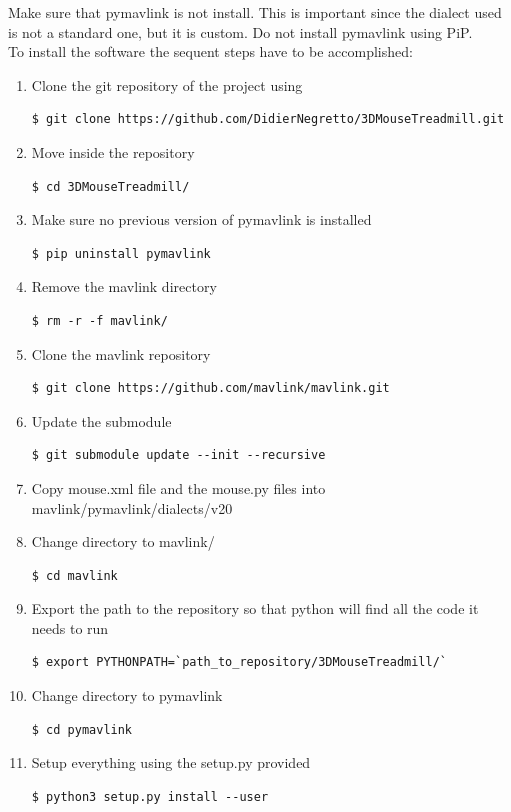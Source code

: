 \documentclass[12pt,a4paper, twoside]{article}
\begin{document}
Make sure that pymavlink is not install. This is important since the dialect used is not a standard one, but it is custom. Do not install pymavlink using PiP.\\

To install the software the sequent steps have to be accomplished:
\begin{enumerate}
	\item Clone the git repository of the project using 
	\begin{lstlisting}[style = Bashstyle]
	$ git clone https://github.com/DidierNegretto/3DMouseTreadmill.git
	\end{lstlisting}
	\item Move inside the repository
	\begin{lstlisting}[style = Bashstyle]
	$ cd 3DMouseTreadmill/
	\end{lstlisting}
	\item Make sure no previous version of pymavlink is installed
	\begin{lstlisting}[style = Bashstyle]
	$ pip uninstall pymavlink
	\end{lstlisting}
	\item Remove the mavlink directory
	\begin{lstlisting}[style = Bashstyle]
	$ rm -r -f mavlink/
	\end{lstlisting}
	\item Clone the mavlink repository
	\begin{lstlisting}[style = Bashstyle]
	$ git clone https://github.com/mavlink/mavlink.git
	\end{lstlisting}
	\item Update the submodule
	\begin{lstlisting}[style = Bashstyle]
	$ git submodule update --init --recursive
	\end{lstlisting}
	\item Copy mouse.xml file and the mouse.py files into mavlink/pymavlink/dialects/v20 
	\item Change directory to mavlink/
	\begin{lstlisting}[style = Bashstyle]
	$ cd mavlink
	\end{lstlisting}
	\item Export the path to the repository so that python will find all the code it needs to run
	\begin{lstlisting}[style = Bashstyle]
	$ export PYTHONPATH=`path_to_repository/3DMouseTreadmill/`
	\end{lstlisting}
	\item Change directory to pymavlink
	\begin{lstlisting}[style = Bashstyle]
	$ cd pymavlink
	\end{lstlisting}
	\item Setup everything using the setup.py provided
	\begin{lstlisting}[style = Bashstyle]
	$ python3 setup.py install --user
	\end{lstlisting}
	
\end{enumerate}
\end{document}
